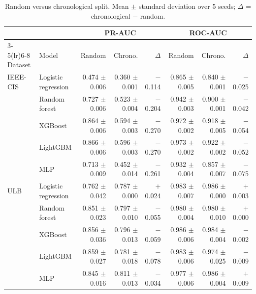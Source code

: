 \begin{table}[htbp]
\caption{Random versus chronological split. Mean $\pm$ standard deviation over 5 seeds; $\Delta$ = chronological $-$ random.}
\label{tab:main}
\small
\begin{tabular}{llrrrrrr}
\toprule
 &  & \multicolumn{3}{c}{PR-AUC} & \multicolumn{3}{c}{ROC-AUC} \\
\cmidrule(lr){3-5}\cmidrule(lr){6-8}
Dataset & Model & Random & Chrono. & $\Delta$ & Random & Chrono. & $\Delta$ \\
\midrule
IEEE-CIS & Logistic regression & 0.474 {\scriptsize$\pm$ 0.006} & 0.360 {\scriptsize$\pm$ 0.001} & $-$0.114 & 0.865 {\scriptsize$\pm$ 0.005} & 0.840 {\scriptsize$\pm$ 0.001} & $-$0.025 \\
 & Random forest & 0.727 {\scriptsize$\pm$ 0.006} & 0.523 {\scriptsize$\pm$ 0.004} & $-$0.204 & 0.942 {\scriptsize$\pm$ 0.003} & 0.900 {\scriptsize$\pm$ 0.001} & $-$0.042 \\
 & XGBoost & 0.864 {\scriptsize$\pm$ 0.006} & 0.594 {\scriptsize$\pm$ 0.003} & $-$0.270 & 0.972 {\scriptsize$\pm$ 0.002} & 0.918 {\scriptsize$\pm$ 0.005} & $-$0.054 \\
 & LightGBM & 0.866 {\scriptsize$\pm$ 0.006} & 0.596 {\scriptsize$\pm$ 0.003} & $-$0.270 & 0.973 {\scriptsize$\pm$ 0.002} & 0.922 {\scriptsize$\pm$ 0.002} & $-$0.052 \\
 & MLP & 0.713 {\scriptsize$\pm$ 0.009} & 0.452 {\scriptsize$\pm$ 0.014} & $-$0.261 & 0.932 {\scriptsize$\pm$ 0.004} & 0.857 {\scriptsize$\pm$ 0.007} & $-$0.075 \\
\addlinespace
ULB & Logistic regression & 0.762 {\scriptsize$\pm$ 0.042} & 0.787 {\scriptsize$\pm$ 0.000} & $+$0.024 & 0.983 {\scriptsize$\pm$ 0.007} & 0.986 {\scriptsize$\pm$ 0.000} & $+$0.003 \\
 & Random forest & 0.851 {\scriptsize$\pm$ 0.023} & 0.797 {\scriptsize$\pm$ 0.010} & $-$0.055 & 0.980 {\scriptsize$\pm$ 0.004} & 0.980 {\scriptsize$\pm$ 0.010} & $+$0.000 \\
 & XGBoost & 0.856 {\scriptsize$\pm$ 0.036} & 0.796 {\scriptsize$\pm$ 0.013} & $-$0.059 & 0.986 {\scriptsize$\pm$ 0.006} & 0.984 {\scriptsize$\pm$ 0.004} & $-$0.002 \\
 & LightGBM & 0.859 {\scriptsize$\pm$ 0.027} & 0.781 {\scriptsize$\pm$ 0.018} & $-$0.078 & 0.983 {\scriptsize$\pm$ 0.006} & 0.974 {\scriptsize$\pm$ 0.025} & $-$0.009 \\
 & MLP & 0.845 {\scriptsize$\pm$ 0.016} & 0.811 {\scriptsize$\pm$ 0.013} & $-$0.034 & 0.977 {\scriptsize$\pm$ 0.006} & 0.986 {\scriptsize$\pm$ 0.004} & $+$0.009 \\
\bottomrule
\end{tabular}
\end{table}
